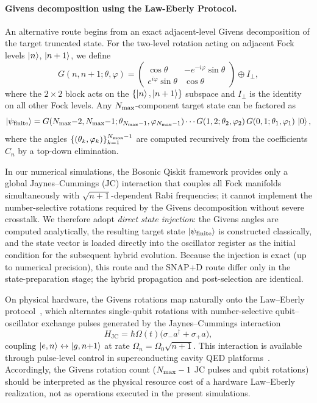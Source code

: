 \documentclass{article}
\begin{document}
\paragraph{Givens decomposition using the Law-Eberly Protocol.}
An alternative route begins from an exact adjacent-level Givens decomposition of the target truncated state. For the two-level rotation acting on adjacent Fock levels $\ket{n}$, $\ket{n+1}$, we define
\begin{equation}
G(n,n{+}1;\theta,\varphi)
=\begin{pmatrix}\cos\theta & -e^{-i\varphi}\sin\theta\\
e^{i\varphi}\sin\theta & \cos\theta\end{pmatrix}
\oplus I_{\perp},
\label{eq:givens-rotation}
\end{equation}
where the $2\times2$ block acts on the $\{\ket{n},\ket{n+1}\}$ subspace
and $I_\perp$ is the identity on all other Fock levels.
Any $N_{\rm max}$-component target state can be factored as
\begin{equation}
\ket{\psi_{\mathrm{finite}}}
=G(N_{\rm max}{-}2,N_{\rm max}{-}1;\theta_{N_{\rm max}-1},\varphi_{N_{\rm max}-1})\cdots G(1,2;\theta_2,\varphi_2)
\,G(0,1;\theta_1,\varphi_1)\,\ket{0},
\label{eq:givens-decomposition}
\end{equation}
where the angles $\{(\theta_k,\varphi_k)\}_{k=1}^{N_{\rm max}-1}$ are computed
recursively from the coefficients $C_n$ by a top-down elimination.

In our numerical simulations, the Bosonic Qiskit framework provides only a global Jaynes--Cummings (JC) interaction that couples all Fock manifolds simultaneously with $\sqrt{n+1}$-dependent Rabi frequencies; it cannot implement the number-selective rotations required by the Givens decomposition without severe crosstalk. We therefore adopt \emph{direct state injection}: the Givens angles are computed analytically, the resulting target state $\ket{\psi_{\mathrm{finite}}}$ is constructed classically, and the state vector is loaded directly into the oscillator register as the initial condition for the subsequent hybrid evolution. Because the injection is exact (up to numerical precision), this route and the SNAP+D route differ only in the state-preparation stage; the hybrid propagation and post-selection are identical.

On physical hardware, the Givens rotations map naturally onto the Law--Eberly protocol~\cite{law1996arbitrary, hofheinz2009synthesizing}, which alternates single-qubit rotations with number-selective qubit--oscillator exchange pulses generated by the Jaynes--Cummings interaction
\begin{equation}
H_{\mathrm{JC}} = \hbar\Omega(t)\bigl(\sigma_- a^\dagger + \sigma_+ a\bigr),
\label{eq:jc-hamiltonian}
\end{equation}
coupling $\ket{e,n}\leftrightarrow\ket{g,n{+}1}$ at rate $\Omega_{n}=\Omega_0\sqrt{n+1}$.
This interaction is available through pulse-level control in superconducting cavity QED platforms~\cite{hofheinz2009synthesizing}. Accordingly, the Givens rotation count ($N_{\rm max}-1$ JC pulses and qubit rotations) should be interpreted as the physical resource cost of a hardware Law--Eberly realization, not as operations executed in the present simulations.
\end{document}
